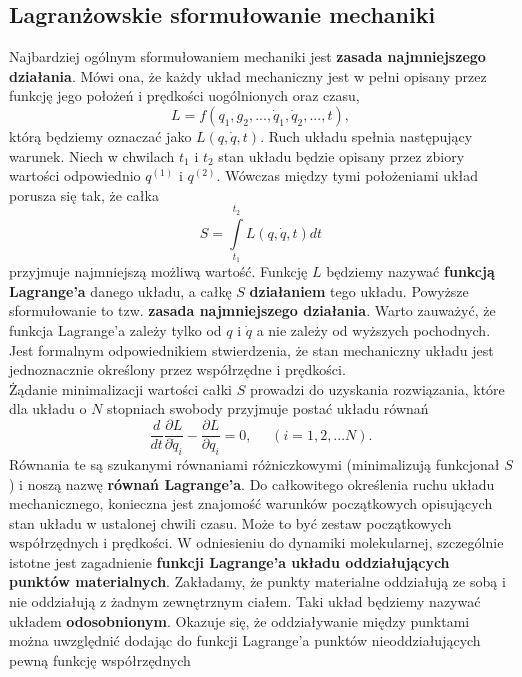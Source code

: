 \documentclass[12pt,a4paper,openright]{report} %
\begin{document}
\subsection{Lagranżowskie sformułowanie mechaniki}
Najbardziej ogólnym sformułowaniem mechaniki jest \textbf{zasada najmniejszego działania}. Mówi ona, że każdy układ mechaniczny jest w pełni opisany przez funkcję jego położeń i prędkości uogólnionych oraz czasu,
\begin{equation}
L=f(q_1, g_2,...,\dot{q}_1, \dot{q}_2,...,t),
\end{equation} 
którą będziemy oznaczać jako $L(q,\dot{q},t)$. Ruch układu spełnia następujący warunek. Niech w chwilach $t_1$ i $t_2$ stan układu będzie opisany przez zbiory wartości odpowiednio $q^{(1)}$ i $q^{(2)}$. Wówczas między tymi położeniami układ porusza się tak, że całka 
\begin{equation}
S=\int\limits_{t_1}^{t_2}L(q, \dot{q}, t) dt
\end{equation} 
przyjmuje najmniejszą możliwą wartość. Funkcję $L$ będziemy nazywać \textbf{funkcją Lagrange'a} danego układu, a całkę $S$ \textbf{działaniem} tego układu. Powyższe sformułowanie to tzw. \textbf{zasada najmniejszego działania}. Warto zauważyć, że funkcja Lagrange'a zależy tylko od $q$ i $\dot{q}$ a nie zależy od wyższych pochodnych. Jest formalnym odpowiednikiem stwierdzenia, że stan mechaniczny układu jest jednoznacznie określony przez współrzędne i prędkości. \\
Żądanie minimalizacji wartości całki $S$ prowadzi do uzyskania rozwiązania, które dla układu o $N$ stopniach swobody przyjmuje postać układu równań
\begin{equation}
\frac{d}{dt}\frac{\partial L}{\partial \dot{q}_i}-\frac{\partial L}{\partial {q}_i}=0, ~~~~~~ (i=1,2,...N).
\label{eq:rownanie_lagrangea}
\end{equation} 
Równania te są szukanymi równaniami różniczkowymi (minimalizują funkcjonał $S$) i noszą nazwę \textbf{równań Lagrange'a}. Do całkowitego określenia ruchu układu mechanicznego, konieczna jest znajomość warunków początkowych opisujących stan układu w ustalonej chwili czasu. Może to być zestaw początkowych współrzędnych i prędkości. W odniesieniu do dynamiki molekularnej, szczególnie istotne jest zagadnienie \textbf{funkcji Lagrange'a układu oddziałujących punktów materialnych}. Zakładamy, że punkty materialne oddziałują ze sobą i nie oddziałują z żadnym zewnętrznym ciałem. Taki układ będziemy nazywać układem \textbf{odosobnionym}. Okazuje się, że oddziaływanie między punktami można uwzględnić dodając do funkcji Lagrange'a punktów nieoddziałujących pewną funkcję współrzędnych
\end{document}
